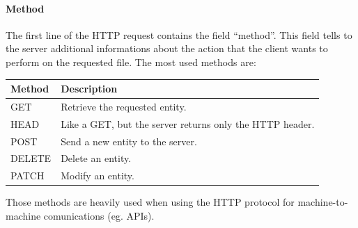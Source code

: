 \paragraph{Method}
The first line of the HTTP request contains the field ``method''. This field tells to the server additional informations about the action that the client wants to perform on the requested file. The most used methods are:
\begin{center}
    \begin{tabular}{l|l}
        \toprule
        \textbf{Method} & \textbf{Description}                                     \\
        \midrule
        GET             & Retrieve the requested entity.                           \\
        HEAD            & Like a GET, but the server returns only the HTTP header. \\
        POST            & Send a new entity to the server.                         \\
        DELETE          & Delete an entity.                                        \\
        PATCH           & Modify an entity.                                        \\
        \bottomrule
    \end{tabular}
\end{center}
Those methods are heavily used when using the HTTP protocol for machine-to-machine comunications (eg. APIs).

